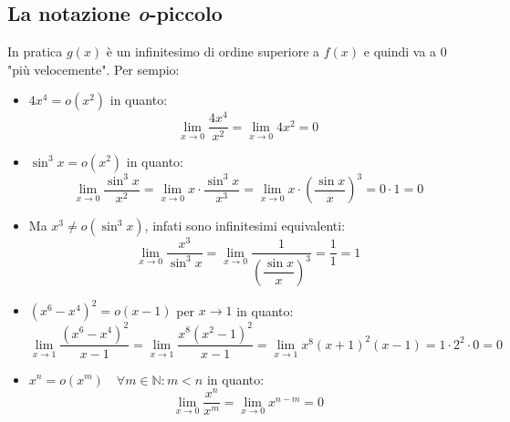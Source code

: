 \subsection{La notazione \textit{o}-piccolo}
In pratica $g(x)$ è un infinitesimo di ordine superiore a $f(x)$ e quindi va a 0 "più velocemente". Per sempio:
\begin{itemize}
	\item $4x^4 = o(x^2)$ in quanto:
		\begin{equation*}
			\lim_{x \to 0} \dfrac{4x^4}{x^2} = \lim_{x \to 0} 4x^2 = 0
		\end{equation*}
	\item $\sin^3{x} = o(x^2)$ in quanto:
		\begin{equation*}
			\lim_{x \to 0} \dfrac{\sin^3{x}}{x^2} = \lim_{x \to 0} x \cdot \dfrac{\sin^3{x}}{x^3} = \lim_{x \to 0} x \cdot \left(\dfrac{\sin{x}}{x} \right)^3 = 0 \cdot 1 = 0
		\end{equation*}
	
	\item Ma $x^3 \neq o(\sin^3{x})$, infati sono infinitesimi equivalenti:
		\begin{equation*}
			\lim_{x \to 0} \dfrac{x^3}{\sin^3{x}} = \lim_{x \to 0} \dfrac{1}{\left(\dfrac{\sin{x}}{x} \right)^3} = \dfrac{1}{1} = 1
		\end{equation*}

	\item $(x^6 - x^4)^2 = o(x-1)$ per $x \to 1$ in quanto:
		\begin{equation*}
			\lim_{x \to 1} \dfrac{(x^6 - x^4)^2}{x-1} = \lim_{x \to 1} \dfrac{x^8 (x^2 -1)^2}{x-1} = \lim_{x \to 1} x^8 (x+1)^2 (x-1) = 1 \cdot 2^2 \cdot 0 = 0
		\end{equation*}

	\item $x^n = o(x^m) \quad \forall m \in \mathbb{N}: m < n$ in quanto:
		\begin{equation*}
			\lim_{x \to 0} \dfrac{x^n}{x^m} = \lim_{x \to 0} x^{n-m} = 0
		\end{equation*}
\end{itemize}

